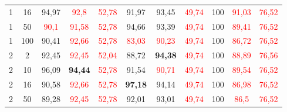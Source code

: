 \begin{table}[ht]
\begin{tabular}{cc|ccc|ccc|ccc}
        {1}                           & {16}    & {94,97}                             & \textcolor{red}{92,8}               & \textcolor{red}{52,78}                   & {91,97}                         & {93,45}                         & \textcolor{red}{49,74}         & {100}                           & \textcolor{red}{91,03}          & \textcolor{red}{76,52}         \\
        {1}                           & {50}    & \textcolor{red}{90,1}               & \textcolor{red}{91,58}              & \textcolor{red}{52,78}                   & {94,66}                         & {93,39}                         & \textcolor{red}{49,74}         & {100}                           & \textcolor{red}{89,41}          & \textcolor{red}{76,52}         \\
        {1}                           & {100}   & {90,41}                             & \textcolor{red}{92,66}              & \textcolor{red}{52,78}                   & \textcolor{red}{83,03}          & \textcolor{red}{90,23}          & \textcolor{red}{49,74}         & {100}                           & \textcolor{red}{86,72}          & \textcolor{red}{76,52}         \\
        {2}                           & {2}     & {92,45}                             & \textcolor{red}{92,45}              & \textcolor{red}{52,04}                   & {88,72}                         & \textbf{94,38}                  & \textcolor{red}{49,74}         & {100}                           & \textcolor{red}{88,89}          & \textcolor{red}{76,56}         \\
        {2}                           & {10}    & {96,09}                             & \textbf{94,44}                      & \textcolor{red}{52,78}                   & {91,54}                         & \textcolor{red}{90,71}          & \textcolor{red}{49,74}         & {100}                           & \textcolor{red}{89,54}          & \textcolor{red}{76,52}         \\
        {2}                           & {16}    & {90,58}                             & \textcolor{red}{92,66}              & \textcolor{red}{52,78}                   & \textbf{97,18}                  & {94,14}                         & \textcolor{red}{49,74}         & {100}                           & \textcolor{red}{86,98}          & \textcolor{red}{76,52}         \\
        {2}                           & {50}    & {89,28}                             & \textcolor{red}{92,45}              & \textcolor{red}{52,78}                   & {92,01}                         & {93,01}                         & \textcolor{red}{49,74}         & {100}                           & \textcolor{red}{86,5}           & \textcolor{red}{76,52}         \\

\end{tabular}
\end{table}
